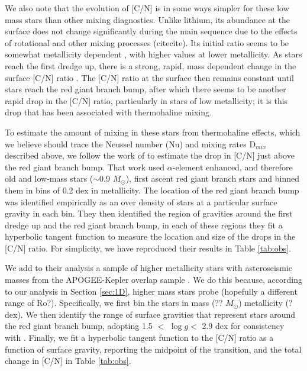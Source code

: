 \documentclass[linenumbers,twocolumn]{aastex62}
\newcommand{\msun}{$M_{\odot}$}
\newcommand{\logg}{\mbox{$\log g$}}
\begin{document}
We also note that the evolution of [C/N] is in some ways simpler for these low mass stars than other mixing diagnostics. Unlike lithium, its abundance at the surface does not change significantly during the main sequence due to the effects of rotational and other mixing processes (citecite). Its initial ratio seems to be somewhat metallicity dependent \citep{Shetrone2019, JackandMarcifSubmitted}, with higher values at lower metallicity. As stars reach the first dredge up, there is a strong, rapid, mass dependent change in the surface [C/N] ratio \citep{MasseronGilmore2015, Martig2016, Ness2016, Spoo2022, maybeotherstufffromtaylorspaper}. The [C/N] ratio at the surface then remains constant until stars reach the red giant branch bump, after which there seems to be another rapid drop in the [C/N] ratio, particularly in stars of low metallicity; it is this drop that has been associated with thermohaline mixing. 

To estimate the amount of mixing in these stars from thermohaline effects, which we believe should trace the Neussel number (Nu) and mixing rates D$_{mix}$ described above, we follow the work of \citet{Shetrone2019} to estimate the drop in [C/N] just above the red giant branch bump. That work used $\alpha$-element enhanced, and therefore old and low-mass stars ($\sim$0.9 \msun), first ascent red giant branch stars and binned them in bins of 0.2 dex in metallicity. The location of the red giant branch bump was identified empirically as an over density of stars at a particular surface gravity in each bin. They then identified the region of gravities around the first dredge up and the red giant branch bump, in each of these regions they fit a hyperbolic tangent function to measure the location and size of the drops in the [C/N] ratio. For simplicity, we have reproduced their results in Table \ref{tab:obs}. 

We add to their analysis a sample of higher metallicity stars with asteroseismic masses from the APOGEE-Kepler overlap sample \citep{Pinsonneault2014, Pinsonneault2018, Pinsonneault2022 }. We do this because, according to our analysis in Section \ref{sec:1D}, higher mass stars probe (hopefully a different range of Ro?). Specifically, we first bin the stars in mass (?? \msun) metallicity (? dex). We then identify the range of surface gravities that represent stars around the red giant branch bump, adopting 1.5 $<$ \logg $<$ 2.9 dex for consistency with \citet{Shetrone2019}. Finally, we fit a hyperbolic tangent function to the [C/N] ratio as a function of surface gravity, reporting the midpoint of the transition, and the total change in [C/N] in Table \ref{tab:obs}.
\end{document}
